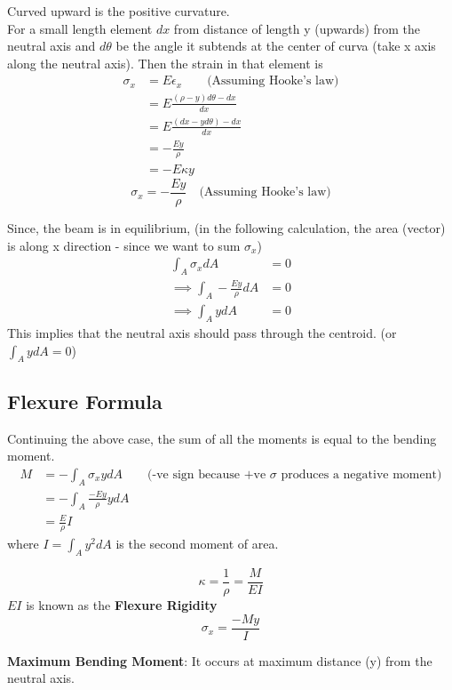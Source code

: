 \documentclass{article}
\begin{document}
		Curved upward is the positive curvature.\\

		For a small length element $dx$ from distance of length y (upwards) from the neutral axis and $d\theta$ be the angle it subtends at the center of curva (take x axis along the neutral axis). Then the strain in that element is
		\begin{align*}
			\sigma_x &= E \epsilon_x \qquad \text{(Assuming Hooke's law)}\\
					 &= E \frac{(\rho -y)d\theta - dx}{dx}\\
					 &= E\frac{(dx - yd\theta) - dx}{dx}\\
					 &= -\frac{Ey}{\rho}\\
					 &= -E\kappa y
		\end{align*}	
		\[\boxed{\sigma_x = - \frac{Ey}\rho} \quad \text{(Assuming Hooke's law)}\]	


		Since, the beam is in equilibrium, (in the following calculation, the area (vector) is along x direction - since we want to sum $\sigma_x$)
		\begin{align*}
			\int_A \sigma_x dA &= 0\\
			\implies \int_A -\frac{Ey}{\rho}dA &=0\\
			\implies \int_A ydA &=0
		\end{align*}
		This implies that the neutral axis should pass through the centroid. (or $\int_A ydA = 0$) 

	\subsection{Flexure Formula}
		Continuing the above case, the sum of all the moments is equal to the bending moment.
		\begin{align*}
			M &= - \int_A \sigma_xy dA \qquad \text{(-ve sign because +ve $\sigma$ produces a negative moment)}\\
			  &= - \int_A \frac{-Ey}{\rho} y dA\\
			  &= \frac{E}{\rho} I 
		\end{align*}
		where $I = \int_A y^2 dA$ is the second moment of area.

		\[\boxed{\kappa = \frac{1}{\rho} = \frac{M}{EI}} \]
		$EI$ is known as the \textbf{Flexure Rigidity}
		\[\boxed{\sigma_x = \frac{-My}{I}}\]

		\textbf{Maximum Bending Moment}: It occurs at maximum distance (y) from the neutral axis.\\
\end{document}
